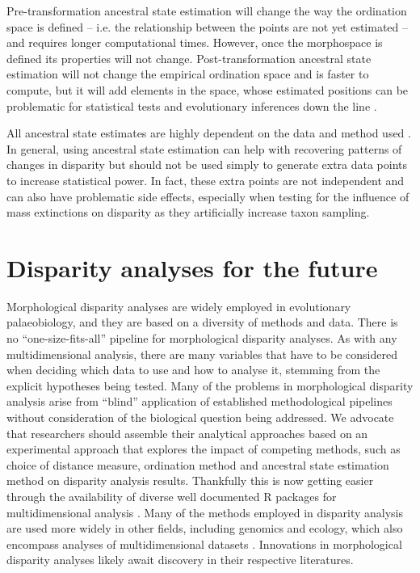\documentclass[12pt,letterpaper]{article}
\begin{document}
Pre-transformation ancestral state estimation will change the way the ordination space is defined -- i.e. the relationship between the points are not yet estimated -- and requires longer computational times.
However, once the morphospace is defined its properties will not change.
Post-transformation ancestral state estimation will not change the empirical ordination space and is faster to compute, but it will add elements in the space, whose estimated positions can be problematic for statistical tests and evolutionary inferences down the line \citep{lloyd2018}.

All ancestral state estimates are highly dependent on the data and method used \cite{Louca2019}.
In general, using ancestral state estimation can help with recovering patterns of changes in disparity but should not be used simply to generate extra data points to increase statistical power.
In fact, these extra points are not independent and can also have problematic side effects, especially when testing for the influence of mass extinctions on disparity as they artificially increase taxon sampling.

\section{Disparity analyses for the future} \label{section:future}

\noindent Morphological disparity analyses are widely employed in evolutionary palaeobiology, and they are based on a diversity of methods and data.
There is no ``one-size-fits-all'' pipeline for morphological disparity analyses.
As with any multidimensional analysis, there are many variables that have to be considered when deciding which data to use and how to analyse it, stemming from the explicit hypotheses being tested.
Many of the problems in morphological disparity analysis arise from ``blind'' application of established methodological pipelines without consideration of the biological question being addressed.
We advocate that researchers should assemble their analytical approaches based on an experimental approach that explores the impact of competing methods, such as choice of distance measure, ordination method and ancestral state estimation method on disparity analysis results.
Thankfully this is now getting easier through the availability of diverse well documented R packages for multidimensional analysis \citep{Navarro2003-vz, Bouxin2005-wk, oksanen2007vegan, Harmon2008-gq, lloyd2016, Guillerme2018-uc}.
Many of the methods employed in disparity analysis are used more widely in other fields, including genomics and ecology, which also encompass analyses of multidimensional datasets \citep{Donohue2013-bg, Saupe2015-vm, Canter2018-hk, mammola2019}.
Innovations in morphological disparity analyses likely await discovery in their respective literatures.
\end{document}
